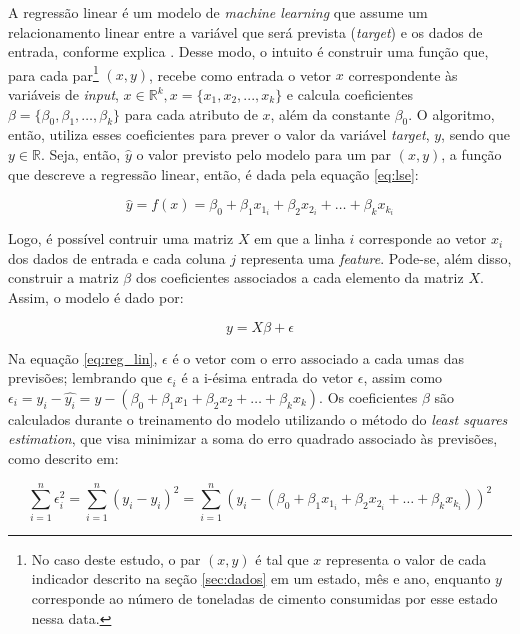A regressão linear é um modelo de \textit{machine learning} que assume um relacionamento
linear entre a variável que será prevista (\textit{target}) e os dados de entrada, conforme explica \citet{forecasting}.
Desse modo, o intuito é construir uma 
função que, para cada par\footnote{No
caso deste estudo, o par  $(x,y)$ é tal que 
$x$ representa o valor de cada
indicador descrito na seção \ref{sec:dados} em um estado, mês e ano, enquanto 
$y$ corresponde ao número de toneladas de cimento consumidas
por esse estado nessa data.} $(x,y)$, recebe como
entrada o vetor $x$ correspondente às variáveis de \textit{input},
$x \in \mathbb{R}^k , x=\{x_1, x_2, ..., x_k\}$ e calcula coeficientes
$\beta = \{\beta_0, \beta_1, \dots, \beta_k\}$ para cada atributo de $x$,
além da constante $\beta_0$. O algoritmo, então, utiliza esses coeficientes para
prever o valor da variável \textit{target}, $y$, sendo 
que $y \in \mathbb{R}$. Seja,
então, $\hat{y}$ o valor previsto pelo modelo para um 
par $(x, y)$, a função que descreve a 
regressão linear, então, é dada pela equação \ref{eq:lse}:

\begin{equation}
  \hat{y} = f(x) = \beta_0 + \beta_1 x_{1_i} + \beta_2 x_{2_i} + \dots + \beta_k x_{k_i} 
  \label{eq:lse}
\end{equation}

Logo, é possível contruir uma matriz $X$ em que a linha $i$
corresponde ao vetor $x_i$ dos dados de entrada e 
cada coluna $j$ representa uma \textit{feature}. Pode-se, 
além disso, construir a matriz $\beta$ dos coeficientes associados 
a cada elemento da matriz $X$. Assim, o modelo
é dado por:

\begin{equation}
  \label{eq:reg_lin}
  y = X\beta + \epsilon
\end{equation}

Na equação \ref{eq:reg_lin}, $\epsilon$ é o vetor com o erro associado a cada umas 
das previsões; lembrando que $\epsilon_i$ é a i-ésima entrada do vetor $\epsilon$, assim como $\epsilon_i = y_i - \hat{y_i} = y - (\beta_0 + \beta_1 x_1 + \beta_2 x_2 + \dots + \beta_k x_k )$.
Os coeficientes $\beta$ são calculados durante o treinamento 
do modelo utilizando o método do \textit{least squares estimation},
que visa minimizar a soma do erro quadrado associado às previsões, 
como descrito em:

\begin{equation}
  \sum_{i=1}^{n} \epsilon_i^2 = \sum_{i=1}^{n} (y_i - \hat{y_i})^2 = 
  \sum_{i=1}^{n} (y_i - (\beta_0 + \beta_1 x_{1_i} + \beta_2 x_{2_i} + \dots + \beta_k x_{k_i} ))^2
\end{equation}

